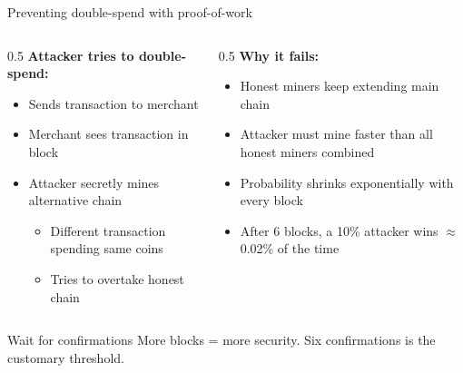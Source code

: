 \ifdefined\PRESENTATION\else\PassOptionsToClass{handout}{beamer}\fi\documentclass[aspectratio=169, lualatex]{beamer}
\begin{document}
\begin{frame}{Preventing double-spend with proof-of-work}
	\begin{columns}[c]
		\begin{column}{0.5\textwidth}
			\textbf{Attacker tries to double-spend:}
			\begin{itemize}
				\item Sends transaction to merchant
				\item Merchant sees transaction in block
				\item Attacker secretly mines alternative chain
				      \begin{itemize}
					      \item Different transaction spending same coins
					      \item Tries to overtake honest chain
				      \end{itemize}
			\end{itemize}
		\end{column}
		\begin{column}{0.5\textwidth}
			\textbf{Why it fails:}
			\begin{itemize}
				\item Honest miners keep extending main chain
				\item Attacker must mine faster than all honest miners combined
				\item Probability shrinks exponentially with every block
				\item After 6 blocks, a 10\% attacker wins $\approx$0.02\% of the time
			\end{itemize}
		\end{column}
	\end{columns}
	\begin{alertblock}{Wait for confirmations}
		More blocks = more security. Six confirmations is the customary threshold.
	\end{alertblock}
\end{frame}
\end{document}
